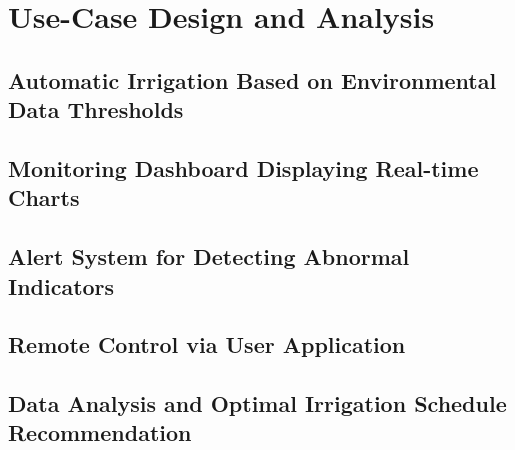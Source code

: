 \clearpage
\section{Use-Case Design and Analysis}
\subsection{Automatic Irrigation Based on Environmental Data Thresholds}
\subsection{Monitoring Dashboard Displaying Real-time Charts}
\subsection{Alert System for Detecting Abnormal Indicators}
\subsection{Remote Control via User Application}
\subsection{Data Analysis and Optimal Irrigation Schedule Recommendation}